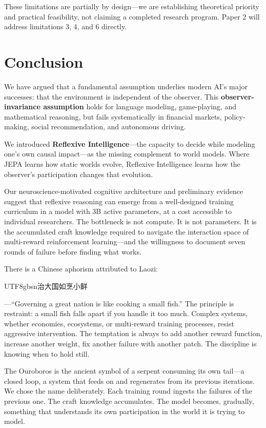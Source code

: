 \documentclass[11pt,a4paper]{article}
\begin{document}
These limitations are partially by design---we are establishing theoretical priority and practical feasibility, not claiming a completed research program. Paper 2 will address limitations 3, 4, and 6 directly.

\section{Conclusion}

We have argued that a fundamental assumption underlies modern AI's major successes: that the environment is independent of the observer. This \textbf{observer-invariance assumption} holds for language modeling, game-playing, and mathematical reasoning, but fails systematically in financial markets, policy-making, social recommendation, and autonomous driving.

We introduced \textbf{Reflexive Intelligence}---the capacity to decide while modeling one's own causal impact---as the missing complement to world models. Where JEPA learns how static worlds evolve, Reflexive Intelligence learns how the observer's participation changes that evolution.

Our neuroscience-motivated cognitive architecture and preliminary evidence suggest that reflexive reasoning can emerge from a well-designed training curriculum in a model with 3B active parameters, at a cost accessible to individual researchers. The bottleneck is not compute. It is not parameters. It is the accumulated craft knowledge required to navigate the interaction space of multi-reward reinforcement learning---and the willingness to document seven rounds of failure before finding what works.

There is a Chinese aphorism attributed to Laozi: \begin{CJK}{UTF8}{gbsn}治大国如烹小鲜\end{CJK}---``Governing a great nation is like cooking a small fish.'' The principle is restraint: a small fish falls apart if you handle it too much. Complex systems, whether economies, ecosystems, or multi-reward training processes, resist aggressive intervention. The temptation is always to add another reward function, increase another weight, fix another failure with another patch. The discipline is knowing when to hold still.

The Ouroboros is the ancient symbol of a serpent consuming its own tail---a closed loop, a system that feeds on and regenerates from its previous iterations. We chose the name deliberately. Each training round ingests the failures of the previous one. The craft knowledge accumulates. The model becomes, gradually, something that understands its own participation in the world it is trying to model.
\end{document}
